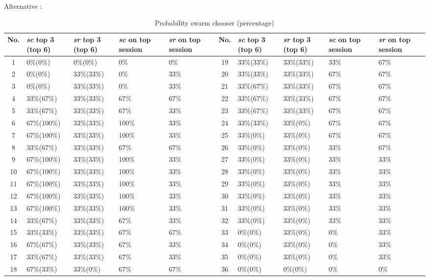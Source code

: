 Alternative : 

\begin{table}[h]
	\centering
	\caption{Probability swarm chooser (percentage)}
	\begin{adjustwidth}{-2.5cm}{}
		\begin{tabular}{|c|p{1.8cm}|p{1.8cm}|p{1.3cm}|p{1.3cm}||c|p{1.8cm}|p{1.8cm}|p{1.3cm}|p{1.3cm}|}
			\hline
			\rowcolor[HTML]{EFEFEF} 
			No. & \textit{sc} top 3 (top 6) & \textit{sr} top 3 (top 6) & \textit{sc} on top session & \textit{sr} on top session & No. & \textit{sc} top 3 (top 6) & \textit{sr} top 3 (top 6) & \textit{sc} on top session & \textit{sr} on top session \\ \hline
			1 & 0\%(0\%) & 0\%(0\%) & 0\% & 0\% & 19 & 33\%(33\%) & 33\%(33\%) & 33\% & 67\%\\\hline
			2 & 0\%(0\%) & 33\%(33\%) & 0\% & 33\% & 20 & 33\%(33\%) & 33\%(33\%) & 67\% & 67\%\\\hline
			3 & 0\%(0\%) & 33\%(33\%) & 0\% & 33\% & 21 & 33\%(67\%) & 33\%(33\%) & 67\% & 67\%\\\hline
			4 & 33\%(67\%) & 33\%(33\%) & 67\% & 67\% & 22 & 33\%(67\%) & 33\%(33\%) & 67\% & 67\%\\\hline
			5 & 33\%(67\%) & 33\%(33\%) & 67\% & 33\% & 23 & 33\%(67\%) & 33\%(33\%) & 67\% & 67\%\\\hline
			6 & 67\%(100\%) & 33\%(33\%) & 100\% & 33\% & 24 & 33\%(33\%) & 33\%(0\%) & 67\% & 67\%\\\hline
			7 & 67\%(100\%) & 33\%(33\%) & 100\% & 33\% & 25 & 33\%(0\%) & 33\%(0\%) & 67\% & 67\%\\\hline
			8 & 33\%(67\%) & 33\%(33\%) & 67\% & 67\% & 26 & 33\%(0\%) & 33\%(0\%) & 33\% & 67\%\\\hline
			9 & 67\%(100\%) & 33\%(33\%) & 100\% & 33\% & 27 & 33\%(0\%) & 33\%(0\%) & 33\% & 33\%\\\hline
			10 & 67\%(100\%) & 33\%(33\%) & 100\% & 33\% & 28 & 33\%(0\%) & 33\%(0\%) & 33\% & 33\%\\\hline
			11 & 67\%(100\%) & 33\%(33\%) & 100\% & 33\% & 29 & 33\%(0\%) & 33\%(0\%) & 33\% & 33\%\\\hline
			12 & 67\%(100\%) & 33\%(33\%) & 100\% & 33\% & 30 & 33\%(0\%) & 33\%(0\%) & 33\% & 33\%\\\hline
			13 & 67\%(100\%) & 33\%(33\%) & 100\% & 33\% & 31 & 33\%(0\%) & 33\%(0\%) & 33\% & 33\%\\\hline
			14 & 33\%(67\%) & 33\%(33\%) & 67\% & 33\% & 32 & 33\%(0\%) & 33\%(0\%) & 33\% & 33\%\\\hline
			15 & 33\%(33\%) & 33\%(33\%) & 67\% & 67\% & 33 & 0\%(0\%) & 33\%(0\%) & 0\% & 33\%\\\hline
			16 & 67\%(67\%) & 33\%(33\%) & 67\% & 33\% & 34 & 0\%(0\%) & 33\%(0\%) & 0\% & 33\%\\\hline
			17 & 33\%(67\%) & 33\%(33\%) & 67\% & 33\% & 35 & 0\%(0\%) & 33\%(0\%) & 0\% & 33\%\\\hline
			18 & 67\%(33\%) & 33\%(0\%) & 67\% & 67\% & 36 & 0\%(0\%) & 0\%(0\%) & 0\% & 0\%\\\hline
		\end{tabular}
	\end{adjustwidth}
\end{table}

